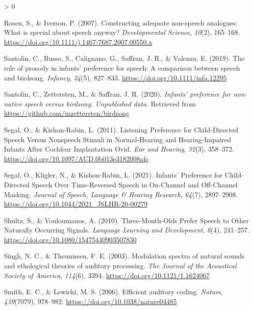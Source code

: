 \documentclass[
  english,
  man]{apa6}
\newlength{\cslhangindent}
\newenvironment{CSLReferences}[2] %
 {%
  \setlength{\parindent}{0pt}
  \ifodd #1 \everypar{\setlength{\hangindent}{\cslhangindent}}\ignorespaces\fi
  \ifnum #2 > 0
  \setlength{\parskip}{#2\baselineskip}
  \fi
 }%
 {}
\begin{document}
\begin{CSLReferences}{1}{0}
\leavevmode\hypertarget{ref-rosen_constructing_2007}{}%
Rosen, S., \& Iverson, P. (2007). Constructing adequate non-speech analogues: What is special about speech anyway? \emph{Developmental Science}, \emph{10}(2), 165--168. \url{https://doi.org/10.1111/j.1467-7687.2007.00550.x}

\leavevmode\hypertarget{ref-santolin_role_2019}{}%
Santolin, C., Russo, S., Calignano, G., Saffran, J. R., \& Valenza, E. (2019). The role of prosody in infants' preference for speech: {A} comparison between speech and birdsong. \emph{Infancy}, \emph{24}(5), 827--833. \url{https://doi.org/10.1111/infa.12295}

\leavevmode\hypertarget{ref-santolin_infants_2020}{}%
Santolin, C., Zettersten, M., \& Saffran, J. R. (2020). \emph{Infants' preference for non-native speech versus birdsong. {Unpublished} data.} Retrieved from \url{https://github.com/mzettersten/birdsong}

\leavevmode\hypertarget{ref-segal_listening_2011}{}%
Segal, O., \& Kishon-Rabin, L. (2011). Listening {Preference} for {Child}-{Directed} {Speech} {Versus} {Nonspeech} {Stimuli} in {Normal}-{Hearing} and {Hearing}-{Impaired} {Infants} {After} {Cochlear} {Implantation} {{}} {Ovid}. \emph{Ear and Hearing}, \emph{32}(3), 358--372. \url{https://doi.org/10.1097/AUD.0b013e3182008afc}

\leavevmode\hypertarget{ref-segal_infants_2021}{}%
Segal, O., Kligler, N., \& Kishon-Rabin, L. (2021). Infants' {Preference} for {Child}-{Directed} {Speech} {Over} {Time}-{Reversed} {Speech} in {On}-{Channel} and {Off}-{Channel} {Masking}. \emph{Journal of Speech, Language \& Hearing Research}, \emph{64}(7), 2897--2908. \url{https://doi.org/10.1044/2021_JSLHR-20-00279}

\leavevmode\hypertarget{ref-shultz_three-month-olds_2010}{}%
Shultz, S., \& Vouloumanos, A. (2010). Three-{Month}-{Olds} {Prefer} {Speech} to {Other} {Naturally} {Occurring} {Signals}. \emph{Language Learning and Development}, \emph{6}(4), 241--257. \url{https://doi.org/10.1080/15475440903507830}

\leavevmode\hypertarget{ref-singh_modulation_2003}{}%
Singh, N. C., \& Theunissen, F. E. (2003). Modulation spectra of natural sounds and ethological theories of auditory processing. \emph{The Journal of the Acoustical Society of America}, \emph{114}(6), 3394. \url{https://doi.org/10.1121/1.1624067}

\leavevmode\hypertarget{ref-smith_efficient_2006}{}%
Smith, E. C., \& Lewicki, M. S. (2006). Efficient auditory coding. \emph{Nature}, \emph{439}(7079), 978--982. \url{https://doi.org/10.1038/nature04485}


\end{CSLReferences}
\end{document}
